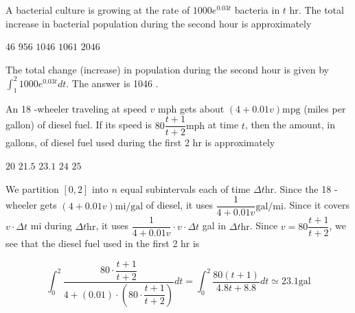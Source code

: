 \newpage




\question
A bacterial culture is growing at the rate of $1000 e^{0.03 t}$ bacteria in $t$ hr. The total increase in bacterial population during the second hour is approximately
\begin{choices}
  \choice $46$
  \choice $956$
  \CorrectChoice $1046$
  \choice $1061$
  \choice $2046$
\end{choices}
\begin{solution}
The total change (increase) in population during the second hour is given by $\int_{1}^{2} 1000 e^{0.03 t} d t$. The answer is 1046 .
\end{solution}

\question
An 18 -wheeler traveling at speed $v$ mph gets about $(4+0.01 v) \mathrm{mpg}$ (miles per gallon) of diesel fuel. If its speed is $80 \dfrac{t+1}{t+2} \mathrm{mph}$ at time $t$, then the amount, in gallons, of diesel fuel used during the first 2 hr is approximately
\begin{choices}
  \choice $20$
  \choice $21.5$
  \CorrectChoice $23.1$
  \choice $24$
  \choice $25$
\end{choices}
\begin{solution}
We partition $[0,2]$ into $n$ equal subintervals each of time $\Delta t \mathrm{hr}$. Since the 18 -wheeler gets $(4+0.01 v) \mathrm{mi} / \mathrm{gal}$ of diesel, it uses $\dfrac{1}{4+0.01 v} \mathrm{gal} / \mathrm{mi}$.
Since it covers $v \cdot \Delta t$ mi during $\Delta t \mathrm{hr}$, it uses $\dfrac{1}{4+0.01 v} \cdot v \cdot \Delta t$ gal in $\Delta t \mathrm{hr}$.
Since $v=80 \dfrac{t+1}{t+2}$, we see that the diesel fuel used in the first 2 hr is


\[
\int_{0}^{2} \dfrac{80 \cdot \dfrac{t+1}{t+2}}{4+(0.01) \cdot\left(80 \cdot \dfrac{t+1}{t+2}\right)} d t=\int_{0}^{2} \dfrac{80(t+1)}{4.8 t+8.8} d t \simeq 23.1 \mathrm{gal}
\]
\end{solution}
